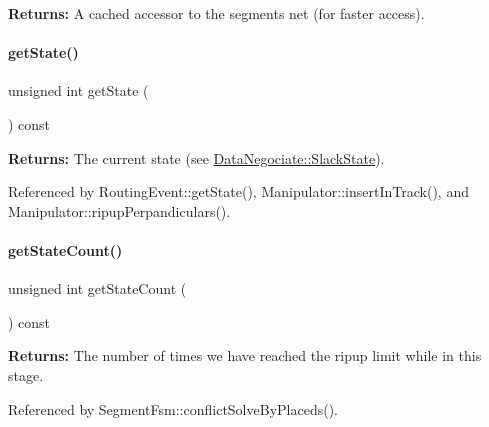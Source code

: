 {\bfseries Returns\+:} A cached accessor to the segment\textquotesingle{}s net (for faster access). \mbox{\label{classKite_1_1DataNegociate_a40ec2b23684a0e6e6d7ac9783a269037}} 
\paragraph{\texorpdfstring{get\+State()}{getState()}}
{\footnotesize\ttfamily unsigned int get\+State (\begin{DoxyParamCaption}{ }\end{DoxyParamCaption}) const\hspace{0.3cm}{\ttfamily [inline]}}

{\bfseries Returns\+:} The current state (see \mbox{\hyperlink{classKite_1_1DataNegociate_ab7ccb6fc1f298728995250a3bbcf18c7}{Data\+Negociate\+::\+Slack\+State}}). 

Referenced by Routing\+Event\+::get\+State(), Manipulator\+::insert\+In\+Track(), and Manipulator\+::ripup\+Perpandiculars().

\mbox{\label{classKite_1_1DataNegociate_a6ad2b700f668f8e2e5cd4fbc717d8765}} 
\paragraph{\texorpdfstring{get\+State\+Count()}{getStateCount()}}
{\footnotesize\ttfamily unsigned int get\+State\+Count (\begin{DoxyParamCaption}{ }\end{DoxyParamCaption}) const\hspace{0.3cm}{\ttfamily [inline]}}

{\bfseries Returns\+:} The number of times we have reached the ripup limit while in this stage. 

Referenced by Segment\+Fsm\+::conflict\+Solve\+By\+Placeds().

\mbox{\label{classKite_1_1DataNegociate_a9832198737bd835fab730ff2b95bbfa0}} 
